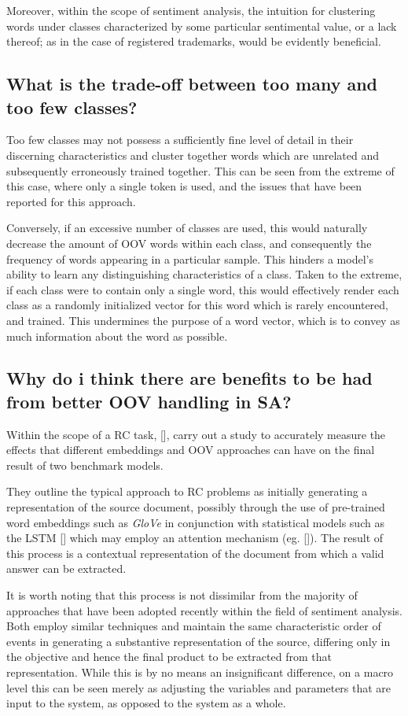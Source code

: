 \documentclass[12pt, a4paper]{report}
\theoremstyle{definition}
\theoremstyle{definition}%
\theoremstyle{definition}%
\theoremstyle{definition}%
\theoremstyle{definition}%
\theoremstyle{definition}%
\renewcommand{\cite}[1]{[\citealp{#1}]}
\begin{document}
Moreover, within the scope of sentiment analysis, the intuition for clustering words under classes characterized by some particular sentimental value, or a lack thereof; as in the case of registered trademarks, would be evidently beneficial.

\subsection{What is the trade-off between too many and too few classes?}
Too few classes may not possess a sufficiently fine level of detail in their discerning characteristics and cluster together words which are unrelated and subsequently erroneously trained together. This can be seen from the extreme of this case, where only a single token is used, and the issues that have been reported for this approach.

Conversely, if an excessive number of classes are used, this would naturally decrease the amount of OOV words within each class, and consequently the frequency of words appearing in a particular sample. This hinders a model's ability to learn any distinguishing characteristics of a class. Taken to the extreme, if each class were to contain only a single word, this would effectively render each class as a randomly initialized vector for this word which is rarely encountered, and trained. This undermines the purpose of a word vector, which is to convey as much information about the word as possible. 

\subsection{Why do i think there are benefits to be had from better OOV handling in SA?}
Within the scope of a RC task, \cite{bhuwandhingra2017}, carry out a study to accurately measure the effects that different embeddings and OOV approaches can have on the final result of two benchmark models. 

They outline the typical approach to RC problems as initially generating a representation of the source document, possibly through the use of pre-trained word embeddings such as \textit{GloVe} in conjunction with statistical models such as the LSTM \cite{hochreiter1997} which may employ an attention mechanism (eg. \cite{bahdanau2014}). The result of this process is a contextual representation of the document from which a valid answer can be extracted. 

It is worth noting that this process is not dissimilar from the majority of approaches that have been adopted recently within the field of sentiment analysis. Both employ similar techniques and maintain the same characteristic order of events in generating a substantive representation of the source, differing only in the objective and hence the final product to be extracted from that representation. While this is by no means an insignificant difference, on a macro level this can be seen merely as adjusting the variables and parameters that are input to the system, as opposed to the system as a whole. 
\end{document}
